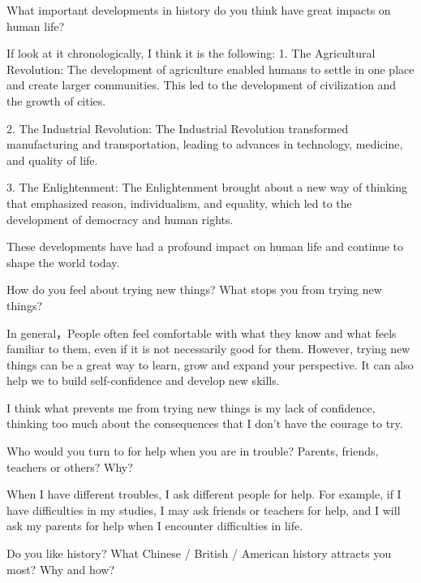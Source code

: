 \documentclass[lang=cn,10pt]{elegantbook}
\begin{document}
\begin{example}
	What important developments in history do you think have great impacts on human life?
\end{example}
\begin{solution}
	If look at it chronologically, I think it is the following:
	1. The Agricultural Revolution: The development of agriculture enabled humans to settle in one place and create larger communities. This led to the development of civilization and the growth of cities.
	
	2. The Industrial Revolution: The Industrial Revolution transformed manufacturing and transportation, leading to advances in technology, medicine, and quality of life.
	
	3. The Enlightenment: The Enlightenment brought about a new way of thinking that emphasized reason, individualism, and equality, which led to the development of democracy and human rights.
	
	These developments have had a profound impact on human life and continue to shape the world today.
\end{solution}
\begin{example}
	How do you feel about trying new things? What stops you from trying new things?
\end{example}
\begin{solution}
	In general，People often feel comfortable with what they know and what feels familiar to them, even if it is not necessarily good for them. However, trying new things can be a great way to learn, grow and expand your perspective. It can also help we to build self-confidence and develop new skills. 
	
	I think what prevents me from trying new things is my lack of confidence, thinking too much about the consequences that I don't have the courage to try.
\end{solution}
\begin{example}
	 Who would you turn to for help when you are in trouble? Parents, friends, teachers or others? Why?
\end{example}
\begin{solution}
	When I have different troubles, I ask different people for help. For example, if I have difficulties in my studies, I may ask friends or teachers for help, and I will ask my parents for help when I encounter difficulties in life.
\end{solution}
\begin{example}
	 Do you like history? What Chinese / British / American history attracts you most? Why and how?
\end{example}
\end{document}
